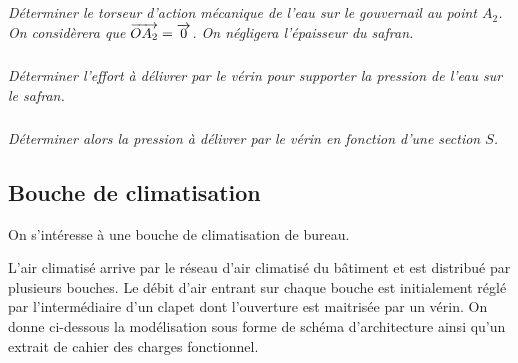 \documentclass[10pt,fleqn]{article} %
\begin{document}
\begin{multicols}{2}

\subparagraph{}
\textit{Déterminer le torseur d'action mécanique de l'eau sur le gouvernail au point $A_2$. On considèrera que $\overrightarrow{OA_2}=\overrightarrow{0}$. On négligera l'épaisseur du safran.} 

%
%
%
%


\subparagraph{}
\textit{Déterminer l'effort à délivrer par le vérin pour supporter la pression de l'eau sur le safran.}

\subparagraph{}
\textit{Déterminer alors la pression à délivrer par le vérin en fonction d'une section $S$.}


\subsection*{Bouche de climatisation}
\setcounter{exo}{0}
On s’intéresse à une bouche de climatisation de bureau.   

L’air climatisé arrive par le réseau d’air climatisé du bâtiment et est distribué par plusieurs bouches. Le débit d’air entrant sur chaque bouche est initialement réglé par l’intermédiaire d’un clapet dont l’ouverture est maitrisée  par un vérin. On donne ci-dessous la modélisation sous forme de schéma d’architecture ainsi qu’un extrait de cahier des charges fonctionnel. 


\end{multicols}
\end{document}

